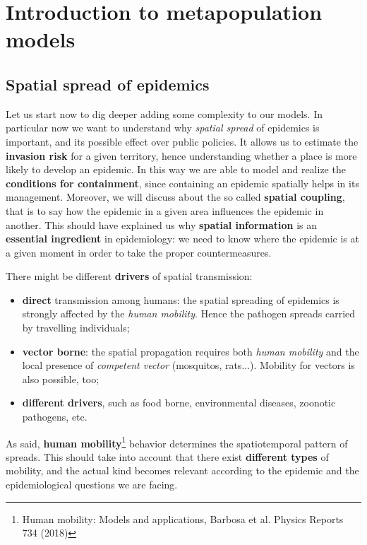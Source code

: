 \documentclass[../main/main.tex]{subfiles}
\begin{document}
\chapter{Introduction to metapopulation models}

\section{Spatial spread of epidemics}
Let us start now to dig deeper adding some complexity to our models. In particular now we want to understand why \textit{spatial spread} of epidemics is important, and its possible effect over public policies. It allows us to estimate the \textbf{invasion risk} for a given territory, hence understanding whether a place is more likely to develop an epidemic. In this way we are able to model and realize the \textbf{conditions for containment}, since containing an epidemic spatially helps in its management. Moreover, we will discuss about the so called \textbf{spatial coupling}, that is to say how the epidemic in a given area influences the epidemic in another. This should have explained us why \textbf{spatial information} is an \textbf{essential ingredient} in epidemiology: we need to know where the epidemic is at a given moment in order to take the proper countermeasures.

There might be different \textbf{drivers} of spatial transmission:
\begin{itemize}
    \item \textbf{direct} transmission among humans: the spatial spreading of epidemics is strongly affected by the \textit{human mobility}. Hence the pathogen spreads carried by travelling individuals;
    \item \textbf{vector borne}: the spatial propagation requires both \textit{human mobility} and the local presence of \textit{competent vector} (mosquitos, rats...). Mobility for vectors is also possible, too;
    \item \textbf{different drivers}, such as food borne, environmental diseases, zoonotic pathogens, etc.
\end{itemize}

As said, \textbf{human mobility}\footnote{Human mobility: Models and applications, Barbosa et al. Physics Reports 734 (2018)} behavior determines the spatiotemporal pattern of spreads. This should take into account that there exist \textbf{different types} of mobility, and the actual kind becomes relevant according to the epidemic and the epidemiological questions we are facing.
\end{document}
